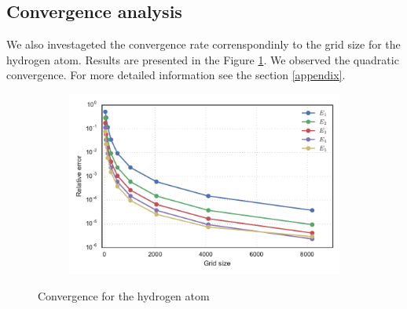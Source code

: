 \documentclass[a4paper, 12pt]{article}
\begin{document}
\subsection{Convergence analysis}
We also investageted the convergence rate correnspondinly to the grid size for the hydrogen atom.  Results are presented in the Figure \ref{h2_grid}. We observed the quadratic convergence. For more detailed information see the section \ref{appendix}.
\begin{figure}[h!]
\centering
\begin{subfigure}{.5\textwidth}
  \centering
  \includegraphics[width=1.0\linewidth]{h2_grid.pdf}
\end{subfigure}
\caption{Convergence for the hydrogen atom}
\label{h2_grid}
\end{figure}
\end{document}
